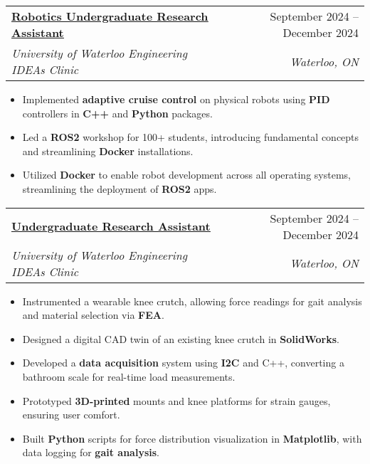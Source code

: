 \documentclass[letterpaper]{article}
\makeatletter
\newcommand{\resumeItem}[1]{
  \item\small{
    {#1 \vspace{-2pt}}
  }
}
\newcommand{\resumeSubheading}[4]{
  \vspace{-2pt}\item
    \begin{tabular*}{0.97\textwidth}[t]{l@{\extracolsep{\fill}}r}
      \textbf{#1} & #2 \\
      \textit{\small#3} & \textit{\small #4} \\
    \end{tabular*}\vspace{-7pt}
}
\newcommand{\resumeItemListStart}{\begin{itemize}}
\newcommand{\resumeItemListEnd}{\end{itemize}\vspace{-5pt}}
\makeatother
\begin{document}
\resumeSubheading
  {\href{https://www.gavintranquilino.com/ideas-clinic.html}{\underline{Robotics Undergraduate Research Assistant}}}{September 2024 -- December 2024}
  {University of Waterloo Engineering IDEAs Clinic}{Waterloo, ON}
  \resumeItemListStart
    \resumeItem{Implemented \textbf{adaptive cruise control} on physical robots using \textbf{PID} controllers in \textbf{C++} and \textbf{Python} packages.}
    \resumeItem{Led a \textbf{ROS2} workshop for 100+ students, introducing fundamental concepts and streamlining \textbf{Docker} installations.}
    \resumeItem{Utilized \textbf{Docker} to enable robot development across all operating systems, streamlining the deployment of \textbf{ROS2} apps.}
  \resumeItemListEnd

\resumeSubheading
  {\href{https://www.gavintranquilino.com/ideas-clinic.html}{\underline{Undergraduate Research Assistant}}}{September 2024 -- December 2024}
  {University of Waterloo Engineering IDEAs Clinic}{Waterloo, ON}
  \resumeItemListStart
    \resumeItem{Instrumented a wearable knee crutch, allowing force readings for gait analysis and material selection via \textbf{FEA}.}
    \resumeItem{Designed a digital CAD twin of an existing knee crutch in \textbf{SolidWorks}.}
    \resumeItem{Developed a \textbf{data acquisition} system using \textbf{I2C} and C++, converting a bathroom scale for real-time load measurements.}
    \resumeItem{Prototyped \textbf{3D-printed} mounts and knee platforms for strain gauges, ensuring user comfort.}
    \resumeItem{Built \textbf{Python} scripts for force distribution visualization in \textbf{Matplotlib}, with data logging for \textbf{gait analysis}.}
  \resumeItemListEnd

\end{document}
